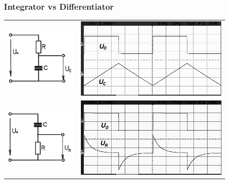 \documentclass{beamer}
\begin{document}
	\begin{frame}
    \frametitle{Integrator vs Differentiator}
		\begin{center}
		\begin{tabular}{m{0.3\linewidth} m{0.6\linewidth}}
			\includegraphics[scale=0.3]{obr17_integrator.png} & \includegraphics[scale=0.4]{obr18_integratorGraf.png}\\
			\includegraphics[scale=0.3]{obr19_diferenciator.png} & \includegraphics[scale=0.4]{obr20_diferenciatorGraf.png}
		\end{tabular}
		\end{center}
  \end{frame}
\end{document}
